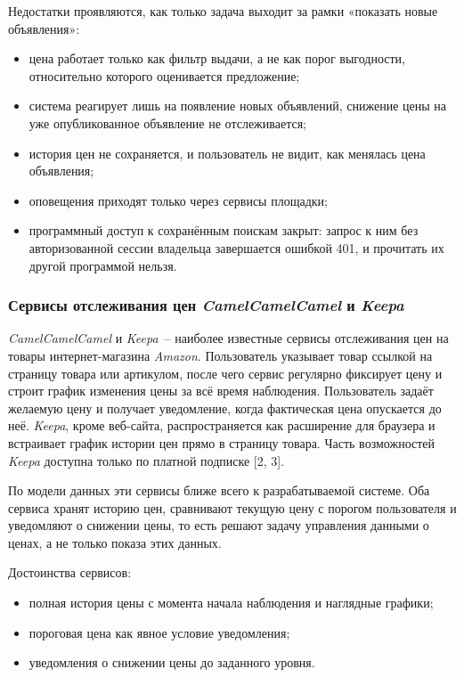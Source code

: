 Недостатки проявляются, как только задача выходит за рамки «показать новые объявления»:
\begin{itemize}
	\item цена работает только как фильтр выдачи, а не как порог выгодности, относительно которого оценивается предложение;
	\item система реагирует лишь на появление новых объявлений, снижение цены на уже опубликованное объявление не отслеживается;
	\item история цен не сохраняется, и пользователь не видит, как менялась цена объявления;
	\item оповещения приходят только через сервисы площадки;
	\item программный доступ к сохранённым поискам закрыт: запрос к ним без авторизованной сессии владельца завершается ошибкой 401, и прочитать их другой программой нельзя.
\end{itemize}

\subsubsection{Сервисы отслеживания цен \textit{CamelCamelCamel} и \textit{Keepa}}

\textit{CamelCamelCamel} и \textit{Keepa}~-- наиболее известные сервисы отслеживания цен на товары интернет-магазина \textit{Amazon}. Пользователь указывает товар ссылкой на страницу товара или артикулом, после чего сервис регулярно фиксирует цену и строит график изменения цены за всё время наблюдения. Пользователь задаёт желаемую цену и получает уведомление, когда фактическая цена опускается до неё. \textit{Keepa}, кроме веб-сайта, распространяется как расширение для браузера и встраивает график истории цен прямо в страницу товара. Часть возможностей \textit{Keepa} доступна только по платной подписке [2, 3].

По модели данных эти сервисы ближе всего к разрабатываемой системе. Оба сервиса хранят историю цен, сравнивают текущую цену с порогом пользователя и уведомляют о снижении цены, то есть решают задачу управления данными о ценах, а не только показа этих данных.

Достоинства сервисов:
\begin{itemize}
	\item полная история цены с момента начала наблюдения и наглядные графики;
	\item пороговая цена как явное условие уведомления;
	\item уведомления о снижении цены до заданного уровня.
\end{itemize}

